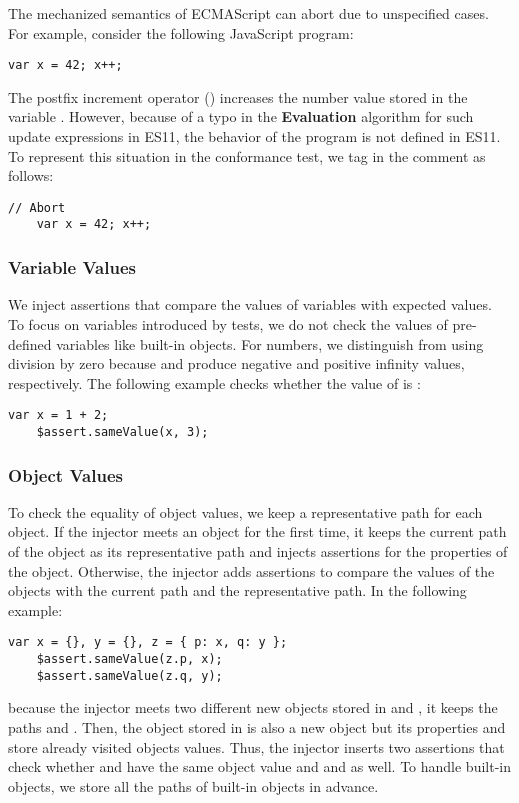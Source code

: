 The mechanized semantics of ECMAScript can abort due to unspecified cases.
For example, consider the following JavaScript program:
\begin{lstlisting}[style=myJSstyle]
    var x = 42; x++;
\end{lstlisting}
The postfix increment operator (\code{++}) increases the number value
stored in the variable .  However, because of a typo in the
\textbf{Evaluation} algorithm for such update expressions in ES11, the
behavior of the program is not defined in ES11.  To represent this situation in
the conformance test, we tag  in the comment as follows:
\begin{lstlisting}[style=myJSstyle]
    // Abort
    var x = 42; x++;
\end{lstlisting}


\subsubsection{Variable Values}

We inject assertions that compare the values of variables with expected values.
To focus on variables introduced by tests, we do not
check the values of pre-defined variables like built-in objects.
For numbers, we distinguish  from  using division by zero because  and
 produce negative and positive infinity values, respectively.
The following example checks whether the value of  is :
\begin{lstlisting}[style=myJSstyle]
    var x = 1 + 2;
    $assert.sameValue(x, 3);
\end{lstlisting}

\subsubsection{Object Values}

To check the equality of object values, we keep a representative path for each object.
If the injector meets an object for the first time, it keeps the current path of the object 
as its representative path and injects assertions for the properties of the object.
Otherwise, the injector adds assertions to compare the values of the
objects with the current path and the representative path.  In
the following example:
\begin{lstlisting}[style=myJSstyle]
    var x = {}, y = {}, z = { p: x, q: y };
    $assert.sameValue(z.p, x);
    $assert.sameValue(z.q, y);
\end{lstlisting}
because the injector meets two different new objects
stored in  and , it keeps the paths  and .
Then, the object stored in  is also a new object but its
properties  and  store already visited objects values.
Thus, the injector inserts two assertions that check whether  and  have
the same object value and  and  as well.
To handle built-in objects, we store all the paths of built-in objects in advance.


